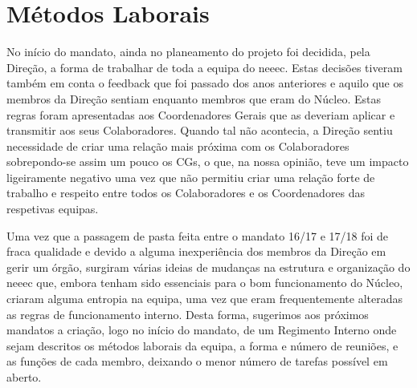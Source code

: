 
\section{Métodos Laborais}

No início do mandato, ainda no planeamento do projeto foi decidida, pela Direção, a forma de trabalhar de toda a equipa do \acrshort{neeec}. Estas decisões tiveram também em conta o feedback que foi passado dos anos anteriores e aquilo que os membros da Direção sentiam enquanto membros que eram do Núcleo. Estas regras foram apresentadas aos Coordenadores Gerais que as deveriam aplicar e transmitir aos seus Colaboradores. Quando tal não acontecia, a Direção sentiu necessidade de criar uma relação mais próxima com os Colaboradores sobrepondo-se assim um pouco os CGs, o que, na nossa opinião, teve um impacto ligeiramente negativo uma vez que não permitiu criar uma relação forte de trabalho e respeito entre todos os Colaboradores e os Coordenadores das respetivas equipas.

Uma vez que a passagem de pasta feita entre o mandato 16/17 e 17/18 foi de fraca qualidade e devido a alguma inexperiência dos membros da Direção em gerir um órgão, surgiram várias ideias de mudanças na estrutura e organização do \acrshort{neeec} que, embora tenham sido essenciais para o bom funcionamento do Núcleo, criaram alguma entropia na equipa, uma vez que eram frequentemente alteradas as regras de funcionamento interno. Desta forma, sugerimos aos próximos mandatos a criação, logo no início do mandato, de um Regimento Interno onde sejam descritos os métodos laborais da equipa, a forma e número de reuniões, e as funções de cada membro, deixando o menor número de tarefas possível em aberto.





{ %
    
}
{ %
}










